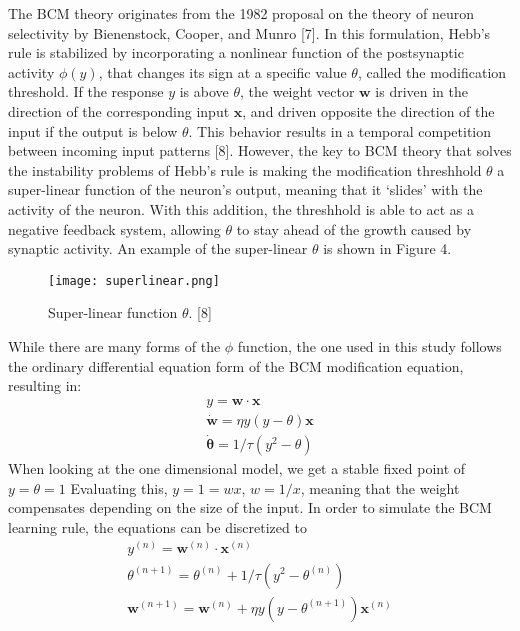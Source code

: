 \documentclass[10pt,twoside]{article}
\begin{document}
The BCM theory originates from the 1982 proposal on the theory of neuron 
selectivity by Bienenstock, Cooper, and Munro [7]. In this formulation, Hebb's rule
is stabilized by incorporating a nonlinear function of the postsynaptic 
activity $\phi(y)$, that changes its sign at a specific value $\theta$, called
the modification threshold. If the response $y$ is above $\theta$, the weight
vector $\mathbf{w}$ is driven in the direction of the corresponding input $\mathbf{x}$, and
driven opposite the direction of the input if the output is below $\theta$.
This behavior results in a temporal competition between incoming input 
patterns [8]. However, the key to BCM theory that						%
solves the instability problems of Hebb's rule is making the modification threshhold
$\theta$ a super-linear function of the neuron's output, meaning that it `slides'
with the activity of the neuron. With this addition, the threshhold is able to 
act as a negative feedback system, allowing $\theta$ to stay ahead of the growth 
caused by synaptic activity. An example of the super-linear $\theta$ is shown
in Figure 4. 										%

\begin{figure}[H]\small\centering\label{fig4}
\texttt{[image: superlinear.png]}
\caption{Super-linear function $\theta$. [8]}
\end{figure}

While there are many forms of the $\phi$ function, the one used in this study 
follows the ordinary differential equation form of the BCM modification equation, resulting in:
\begin{align}
		y = \mathbf{w} \cdot \mathbf{x} \\
		\mathbf{\dot w} = \eta y(y-\theta)\mathbf{x} \\
		\mathbf{\dot \theta} = 1/\tau ( y^2 - \theta) 
\end{align}
When looking at the one dimensional model, we get a stable fixed point of $y = \theta = 1$
Evaluating this, $y = 1 = wx$, $w = 1/x$, meaning that the weight compensates depending on the size of the input.
In order to simulate the BCM learning rule, the equations can be discretized to
 \begin{align}
			y^{(n)} = \mathbf{w} ^{(n)} \cdot \mathbf{x} ^{(n)} \\        		 			            %
		   	\theta^{(n+1)} = \theta^{(n)} + 1/\tau ( y^2 - \theta^{(n)}) \\
			\mathbf{w}^{(n+1)} = \mathbf{w}^{(n)} + \eta y ( y - \theta^{(n+1)} ) \mathbf{x}^{(n)}
\end{align}
\end{document}
